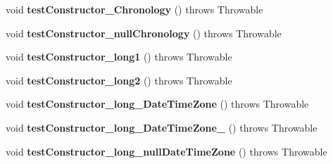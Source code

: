 \begin{DoxyCompactItemize}
\item 
\hypertarget{classorg_1_1joda_1_1time_1_1_test_local_time___constructors_a5c00530a137263199139ca18f4a439d2}{void {\bfseries test\-Constructor\-\_\-\-Chronology} ()  throws Throwable }\label{classorg_1_1joda_1_1time_1_1_test_local_time___constructors_a5c00530a137263199139ca18f4a439d2}

\item 
\hypertarget{classorg_1_1joda_1_1time_1_1_test_local_time___constructors_af74630a06c62d94dc25805bc7123e052}{void {\bfseries test\-Constructor\-\_\-null\-Chronology} ()  throws Throwable }\label{classorg_1_1joda_1_1time_1_1_test_local_time___constructors_af74630a06c62d94dc25805bc7123e052}

\item 
\hypertarget{classorg_1_1joda_1_1time_1_1_test_local_time___constructors_a8ec4eeacfb55101f9460a76527107628}{void {\bfseries test\-Constructor\-\_\-long1} ()  throws Throwable }\label{classorg_1_1joda_1_1time_1_1_test_local_time___constructors_a8ec4eeacfb55101f9460a76527107628}

\item 
\hypertarget{classorg_1_1joda_1_1time_1_1_test_local_time___constructors_a2d725247f8d62f85285f1e14eaa0545d}{void {\bfseries test\-Constructor\-\_\-long2} ()  throws Throwable }\label{classorg_1_1joda_1_1time_1_1_test_local_time___constructors_a2d725247f8d62f85285f1e14eaa0545d}

\item 
\hypertarget{classorg_1_1joda_1_1time_1_1_test_local_time___constructors_a375e7da56c9f3434fcd4eaac540c248a}{void {\bfseries test\-Constructor\-\_\-long\-\_\-\-Date\-Time\-Zone} ()  throws Throwable }\label{classorg_1_1joda_1_1time_1_1_test_local_time___constructors_a375e7da56c9f3434fcd4eaac540c248a}

\item 
\hypertarget{classorg_1_1joda_1_1time_1_1_test_local_time___constructors_a65d29062f44593adeb7da91f2ed9944e}{void {\bfseries test\-Constructor\-\_\-long\-\_\-\-Date\-Time\-Zone\-\_} ()  throws Throwable }\label{classorg_1_1joda_1_1time_1_1_test_local_time___constructors_a65d29062f44593adeb7da91f2ed9944e}

\item 
\hypertarget{classorg_1_1joda_1_1time_1_1_test_local_time___constructors_a37de6ce9f752f5ddcb3240e2490bcc16}{void {\bfseries test\-Constructor\-\_\-long\-\_\-null\-Date\-Time\-Zone} ()  throws Throwable }\label{classorg_1_1joda_1_1time_1_1_test_local_time___constructors_a37de6ce9f752f5ddcb3240e2490bcc16}


\end{DoxyCompactItemize}
